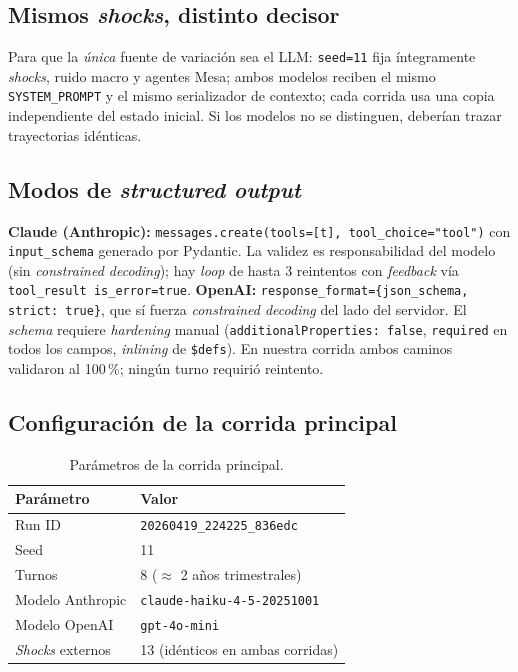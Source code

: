 \documentclass[conference]{IEEEtran}
\begin{document}
\subsection{Mismos \emph{shocks}, distinto decisor}

Para que la \emph{\'unica} fuente de variaci\'on sea el LLM:
\texttt{seed=11} fija \'integramente \emph{shocks}, ruido macro y
agentes Mesa; ambos modelos reciben el mismo \texttt{SYSTEM\_PROMPT}
y el mismo serializador de contexto; cada corrida usa una copia
independiente del estado inicial. Si los modelos no se distinguen,
deber\'ian trazar trayectorias id\'enticas.

\subsection{Modos de \emph{structured output}}

\textbf{Claude (Anthropic):} \texttt{messages.create(tools=[t],
tool\_choice="tool")} con \texttt{input\_schema} generado por Pydantic.
La validez es responsabilidad del modelo (sin \emph{constrained
decoding}); hay \emph{loop} de hasta 3 reintentos con \emph{feedback}
v\'ia \texttt{tool\_result is\_error=true}.
\textbf{OpenAI:} \texttt{response\_format=\{json\_schema, strict:
true\}}, que s\'i fuerza \emph{constrained decoding} del lado del
servidor. El \emph{schema} requiere \emph{hardening} manual
(\texttt{additionalProperties: false}, \texttt{required} en todos los
campos, \emph{inlining} de \texttt{\$defs}). En nuestra corrida ambos
caminos validaron al 100\,\%; ning\'un turno requiri\'o reintento.

\subsection{Configuraci\'on de la corrida principal}

\begin{table}[h]
\centering
\caption{Par\'ametros de la corrida principal.}
\label{tab:config}
\begin{tabular}{ll}
\toprule
Par\'ametro & Valor \\
\midrule
Run ID & \texttt{20260419\_224225\_836edc} \\
Seed & 11 \\
Turnos & 8 ($\approx$ 2 a\~nos trimestrales) \\
Modelo Anthropic & \texttt{claude-haiku-4-5-20251001} \\
Modelo OpenAI & \texttt{gpt-4o-mini} \\
\emph{Shocks} externos & 13 (id\'enticos en ambas corridas) \\
\bottomrule
\end{tabular}
\end{table}
\end{document}
